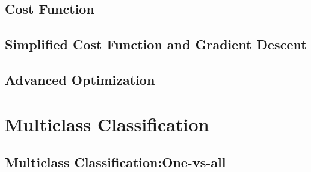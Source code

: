\documentclass{article}
\begin{document}
\begin{CJK}{UTF8}{gbsn}
\subsection{Cost Function}
\subsection{Simplified Cost Function and Gradient Descent}
\subsection{Advanced Optimization} 

\section{Multiclass Classification}
\subsection{Multiclass Classification:One-vs-all}
\subparagraph*{}
\end{CJK}
\end{document}
